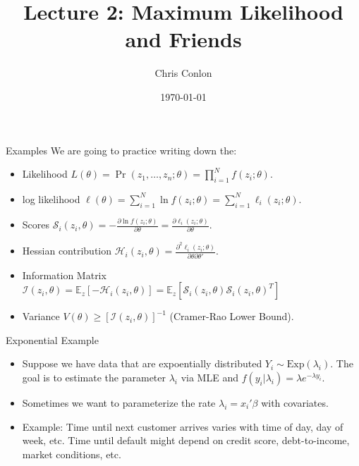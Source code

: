 \documentclass[aspectratio=169]{beamer}
\title{Lecture 2: Maximum Likelihood and Friends}
\author{Chris Conlon }
\institute{NYU Stern }
\date{\today}
\begin{document}
\maketitle

\begin{frame}{Examples}
We are going to practice writing down the:
\begin{itemize}
\item Likelihood $L(\theta)= \Pr(z_1,\ldots,z_n ; \theta) = \prod_{i=1}^N f(z_i ; \theta)$.
\item log likelihood $\ell(\theta)= \sum_{i=1}^N \ln f(z_i ; \theta) = \sum_{i=1}^N \ell_i(z_i ; \theta)$.
\item Scores $\mathcal{S}_i(z_i, \theta) =-\frac{\partial \ln f(z_i ; \theta)}{\partial \theta}=\frac{\partial \ell_i(z_i ; \theta)}{\partial \theta}$.
\item Hessian contribution $\mathcal{H}_i(z_i, \theta) =\frac{\partial^2 \ell_i(z_i ; \theta)}{\partial \theta \partial \theta'}$.
\item Information Matrix $\mathcal{I}(z_i, \theta) = \mathbb{E}_z[-\mathcal{H}_i(z_i,\theta)]=\mathbb{E}_z[\mathcal{S}_i(z_i,\theta) \mathcal{S}_i(z_i,\theta)^T]$
\item Variance $V(\theta) \geq [\mathcal{I}(z_i, \theta)]^{-1} $ (Cramer-Rao Lower Bound).
\end{itemize}

\end{frame}


\begin{frame}{Exponential Example}
\begin{itemize}
\item Suppose we have data that are expoentially distributed $Y_i \sim \text{Exp}(\lambda_i)$. The goal is to estimate the parameter $\lambda_i$ via MLE and $f(y_i | \lambda_i) = \lambda e^{-\lambda y_i}$.
\item Sometimes we want to parameterize the rate $\lambda_i = x_i' \beta$ with covariates.
\item Example: Time until next customer arrives varies with time of day, day of week, etc. Time until default might depend on credit score, debt-to-income, market conditions, etc.
\end{itemize}
\end{frame}
\end{document}
